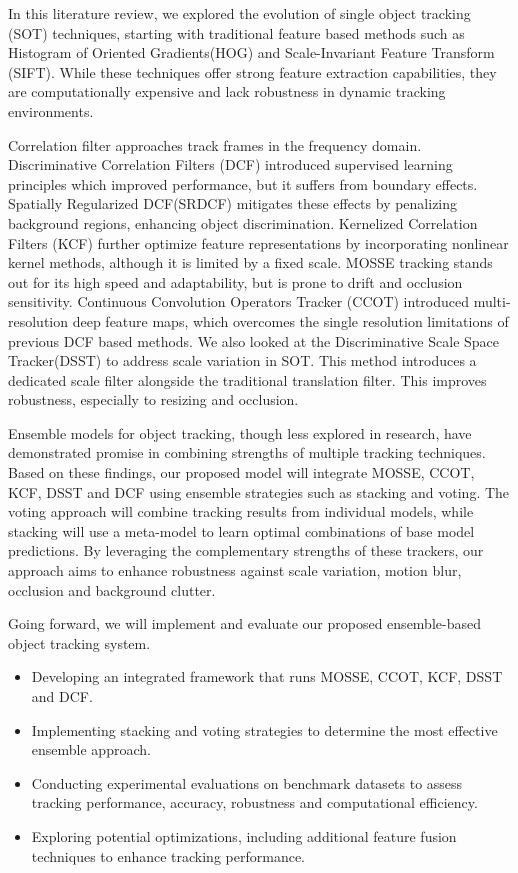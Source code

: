 \documentclass[11pt, letterpaper]{article}
\begin{document}
In this literature review, we explored the evolution of single object tracking (SOT) techniques, starting with traditional feature based methods such as Histogram of Oriented Gradients(HOG) and Scale-Invariant Feature Transform (SIFT). While these techniques offer strong feature extraction capabilities, they are computationally expensive and lack robustness in dynamic tracking environments.

Correlation filter approaches track frames in the frequency domain. Discriminative Correlation Filters (DCF) introduced supervised learning principles which improved performance, but it suffers from boundary effects. Spatially Regularized DCF(SRDCF) mitigates these effects by penalizing background regions, enhancing object discrimination. Kernelized Correlation Filters (KCF) further optimize feature representations by incorporating nonlinear kernel methods, although it is limited by a fixed scale. MOSSE tracking stands out for its high speed and adaptability, but is prone to drift and occlusion sensitivity. Continuous Convolution Operators Tracker (CCOT) introduced multi-resolution deep feature maps, which overcomes the single resolution limitations of previous DCF based methods. We also looked at the Discriminative Scale Space Tracker(DSST) to address scale variation in SOT. This method introduces a dedicated scale filter alongside the traditional translation filter. This improves robustness, especially to resizing and occlusion.

Ensemble models for object tracking, though less explored in research, have demonstrated promise in combining strengths of multiple tracking techniques. Based on these findings, our proposed model will integrate MOSSE, CCOT, KCF, DSST and DCF using ensemble strategies such as stacking and voting. The voting approach will combine tracking results from individual models, while stacking will use a meta-model to learn optimal combinations of base model predictions. By leveraging the complementary strengths of these trackers, our approach aims to enhance robustness against scale variation, motion blur, occlusion and background clutter.

Going forward, we will implement and evaluate our proposed ensemble-based object tracking system.

\begin{itemize}
  \item Developing an integrated framework that runs MOSSE, CCOT, KCF, DSST and DCF.
  \item Implementing stacking and voting strategies to determine the most effective ensemble approach.
  \item Conducting experimental evaluations on benchmark datasets to assess tracking performance, accuracy, robustness and computational efficiency.
  \item Exploring potential optimizations, including additional feature fusion techniques to enhance tracking performance.
\end{itemize}
\end{document}
